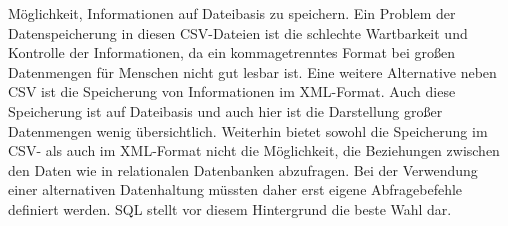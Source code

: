 \begin{description}
  Möglichkeit, Informationen auf Dateibasis zu speichern. Ein Problem der
  Datenspeicherung in diesen CSV-Dateien ist die schlechte Wartbarkeit und
  Kontrolle der Informationen, da ein kommagetrenntes Format bei großen
  Datenmengen für Menschen nicht gut lesbar ist. Eine weitere Alternative neben
  CSV ist die Speicherung von Informationen im XML-Format. Auch diese
  Speicherung ist auf Dateibasis und auch hier ist die Darstellung großer
  Datenmengen wenig übersichtlich. Weiterhin bietet sowohl die Speicherung im
  CSV- als auch im XML-Format nicht die Möglichkeit, die Beziehungen zwischen
  den Daten wie in relationalen Datenbanken abzufragen. Bei der Verwendung
  einer alternativen Datenhaltung müssten daher erst eigene Abfragebefehle
  definiert werden. SQL stellt vor diesem Hintergrund die beste Wahl dar.
\end{description}